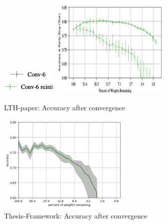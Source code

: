 \begin{figure}
	\begin{minipage}{\textwidth}
		\centering
		\includegraphics[width=100px]{gfx/7-Evaluation/LTH_4_legend.png}
	\end{minipage}
	\begin{minipage}{0.5\textwidth}
		\centering
		\includegraphics[height=180px]{gfx/7-Evaluation/LTH_CNN_clean.png}
		\caption*{LTH-paper: Accuracy after convergence}
		\label{?}
	\end{minipage}\hfill
	\begin{minipage}{0.5\textwidth}
		\centering
		\includegraphics[height=180px]{gfx/Experiments/Reproduction-CIFAR10-CNN/accuracy/LTH.png}
		\caption*{Thesis-Framework: Accuracy after convergence}
		\label{?}
	\end{minipage}
\end{figure}

